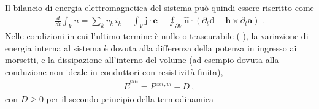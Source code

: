 \documentclass[letterpaper,10pt,italian]{jupyterBook}
\begin{document}
\sphinxAtStartPar
Il bilancio di energia elettromagnetica del sistema può quindi essere riscritto come
\begin{equation*}
\begin{split}\frac{d}{dt} \int_V u = \sum_k v_k \, i_k - \int_{V} \mathbf{j} \cdot \mathbf{e} - \oint_{\partial V} \hat{\mathbf{n}} \cdot \left( \partial_t \mathbf{d} + \mathbf{h} \times \partial_t \mathbf{a} \right) \ .\end{split}
\end{equation*}
\sphinxAtStartPar
Nelle condizioni in cui l’ultimo termine è nullo o trascurabile ( ), la variazione di energia interna al sistema è dovuta alla differenza della potenza in ingresso ai morsetti, e la dissipazione all’interno del volume (ad esempio dovuta alla conduzione non ideale in conduttori con resistività finita),
\begin{equation*}
\begin{split}\dot{E}^{em} = P^{ext, vi} - \dot{D} \ ,\end{split}
\end{equation*}
\sphinxAtStartPar
con \(\dot{D} \ge 0\) per il secondo principio della termodinamica  

\sphinxstepscope
\end{document}
